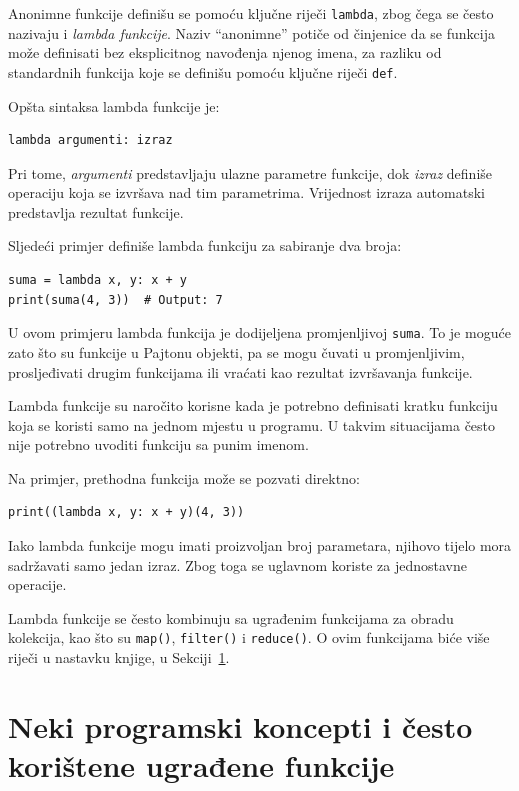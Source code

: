 Anonimne funkcije definišu se pomoću ključne riječi \texttt{lambda}, zbog čega se često nazivaju i \textit{lambda funkcije}. Naziv ``anonimne'' potiče od činjenice da se funkcija može definisati bez eksplicitnog navođenja njenog imena, za razliku od standardnih funkcija koje se definišu pomoću ključne riječi \texttt{def}.

Opšta sintaksa lambda funkcije je:

\begin{verbatim}
lambda argumenti: izraz
\end{verbatim}

Pri tome, \textit{argumenti} predstavljaju ulazne parametre funkcije, dok \textit{izraz} definiše operaciju koja se izvršava nad tim parametrima. Vrijednost izraza automatski predstavlja rezultat funkcije.

Sljedeći primjer definiše lambda funkciju za sabiranje dva broja:

\begin{verbatim}
suma = lambda x, y: x + y
print(suma(4, 3))  # Output: 7
\end{verbatim}

U ovom primjeru lambda funkcija je dodijeljena promjenljivoj \texttt{suma}. To je moguće zato što su funkcije u Pajtonu objekti, pa se mogu čuvati u promjenljivim, prosljeđivati drugim funkcijama ili vraćati kao rezultat izvršavanja funkcije.

Lambda funkcije su naročito korisne kada je potrebno definisati kratku funkciju koja se koristi samo na jednom mjestu u programu. U takvim situacijama često nije potrebno uvoditi funkciju sa punim imenom.

Na primjer, prethodna funkcija može se pozvati direktno:

\begin{verbatim}
print((lambda x, y: x + y)(4, 3))
\end{verbatim}

Iako lambda funkcije mogu imati proizvoljan broj parametara, njihovo tijelo mora sadržavati samo jedan izraz. Zbog toga se uglavnom koriste za jednostavne operacije.

Lambda funkcije se često kombinuju sa ugrađenim funkcijama za obradu kolekcija, kao što su \texttt{map()}, \texttt{filter()} i \texttt{reduce()}. O ovim funkcijama biće više riječi u nastavku knjige, u Sekciji~\ref{sec:concepts-pyhton}.


\section{Neki programski koncepti i često korištene ugrađene funkcije}
\label{sec:concepts-pyhton}

